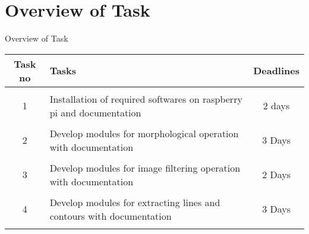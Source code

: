 \documentclass[10pt, a4paper]{beamer}
\begin{document}
\section{Overview of Task}
\begin{frame}{Overview of Task}
	\centering
	\begin{tabular}{ c  p{6cm}  c }
	
		\\
			\rowcolor{LightCyan}
		Task no & \centering Tasks & Deadlines  \\
		\hline
		\\
		\rowcolor{LightCyan}
		1 & \small{Installation of required softwares on raspberry pi and documentation } & 2 days\\
		\hline
		\\
		\rowcolor{LightCyan}
		2 & Develop modules for morphological operation with documentation & 3 Days\\
		\hline
		\\
		\rowcolor{LightCyan}
		3 & Develop modules for image filtering operation  with documentation & 2 Days\\
		\hline
		\\
		\rowcolor{LightCyan}
		4 & Develop modules for extracting lines and contours with documentation & 3 Days \\
		\hline \\
		
		
     \end{tabular}
\end{frame}
\end{document}
